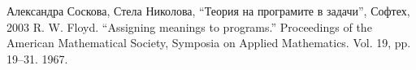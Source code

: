 \documentclass[12pt,a4paper]{article}
\begin{document}
\pagebreak

\begin{thebibliography}{99}

	Александра Соскова, Стела Николова, ``Теория на програмите в задачи'', Софтех, 2003
 R. W. Floyd. ``Assigning meanings to programs.'' Proceedings of the American Mathematical Society, Symposia on Applied Mathematics. Vol. 19, pp. 19–31. 1967.

\end{thebibliography}
\end{document}
